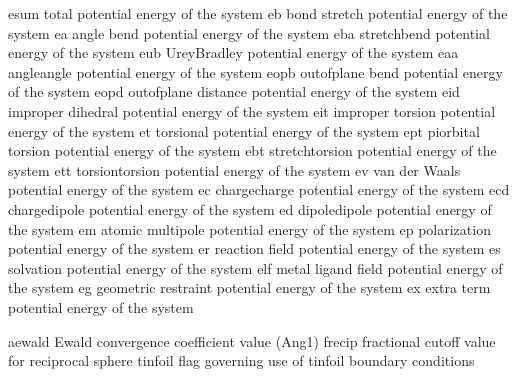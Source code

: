 \documentclass[letterpaper,11pt,english]{sphinxmanual}
\begin{document}

\begin{sphinxVerbatim}[commandchars=\\\{\}]
esum            total potential energy of the system
eb              bond stretch potential energy of the system
ea              angle bend potential energy of the system
eba             stretch\PYGZhy{}bend potential energy of the system
eub             Urey\PYGZhy{}Bradley potential energy of the system
eaa             angle\PYGZhy{}angle potential energy of the system
eopb            out\PYGZhy{}of\PYGZhy{}plane bend potential energy of the system
eopd            out\PYGZhy{}of\PYGZhy{}plane distance potential energy of the system
eid             improper dihedral potential energy of the system
eit             improper torsion potential energy of the system
et              torsional potential energy of the system
ept             pi\PYGZhy{}orbital torsion potential energy of the system
ebt             stretch\PYGZhy{}torsion potential energy of the system
ett             torsion\PYGZhy{}torsion potential energy of the system
ev              van der Waals potential energy of the system
ec              charge\PYGZhy{}charge potential energy of the system
ecd             charge\PYGZhy{}dipole potential energy of the system
ed              dipole\PYGZhy{}dipole potential energy of the system
em              atomic multipole potential energy of the system
ep              polarization potential energy of the system
er              reaction field potential energy of the system
es              solvation potential energy of the system
elf             metal ligand field potential energy of the system
eg              geometric restraint potential energy of the system
ex              extra term potential energy of the system
\end{sphinxVerbatim}


\begin{sphinxVerbatim}[commandchars=\\\{\}]
aewald          Ewald convergence coefficient value (Ang\PYGZhy{}1)
frecip          fractional cutoff value for reciprocal sphere
tinfoil         flag governing use of tinfoil boundary conditions
\end{sphinxVerbatim}

\end{document}
